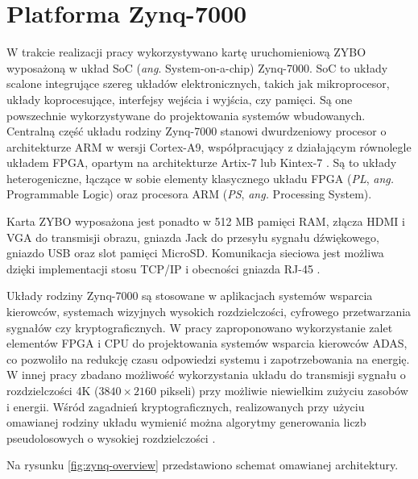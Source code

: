 \chapter{Platforma Zynq-7000}
\label{cha:platform}

W trakcie realizacji pracy wykorzystywano kartę uruchomieniową ZYBO wyposażoną w układ SoC (\emph{ang}. System-on-a-chip) Zynq-7000. 
SoC to układy scalone integrujące szereg układów elektronicznych, takich jak mikroprocesor, układy koprocesujące, interfejsy wejścia i wyjścia, czy pamięci. 
Są one powszechnie wykorzystywane do projektowania systemów wbudowanych. 
Centralną część układu rodziny Zynq-7000 stanowi dwurdzeniowy procesor o architekturze ARM w wersji Cortex-A9, współpracujący z działającym równolegle układem FPGA, opartym na architekturze Artix-7 lub Kintex-7 \cite{zynq-homepage}.
Są to układy heterogeniczne, łączące w sobie elementy klasycznego układu FPGA (\emph{PL}, \emph{ang.} Programmable Logic) oraz procesora ARM (\emph{PS}, \emph{ang.} Processing System). %

Karta ZYBO wyposażona jest ponadto w 512 MB pamięci RAM, złącza HDMI i VGA do transmisji obrazu, gniazda Jack do przesyłu sygnału dźwiękowego, gniazdo USB oraz slot pamięci MicroSD.
Komunikacja sieciowa jest możliwa dzięki implementacji stosu TCP/IP i obecności gniazda RJ-45 \cite{zynq-datasheet}.


Układy rodziny Zynq-7000 są stosowane w aplikacjach systemów wsparcia kierowców, systemach wizyjnych wysokich rozdzielczości, cyfrowego przetwarzania sygnałów czy kryptograficznych. 
W pracy \cite{GuanwenZhong} zaproponowano wykorzystanie zalet elementów FPGA i CPU do projektowania systemów wsparcia kierowców ADAS, co pozwoliło na redukcję czasu odpowiedzi systemu i zapotrzebowania na energię.
W innej pracy \cite{MaleenAbeydeera} zbadano możliwość wykorzystania układu do transmisji sygnału o rozdzielczości 4K ($3840 \times 2160$ pikseli) przy możliwie niewielkim zużyciu zasobów i energii.
Wśród zagadnień kryptograficznych, realizowanych przy użyciu omawianej rodziny układu wymienić można algorytmy generowania liczb pseudolosowych o wysokiej rozdzielczości	\cite{PawelDabal2014}.

Na rysunku \ref{fig:zynq-overview} przedstawiono schemat omawianej architektury.

